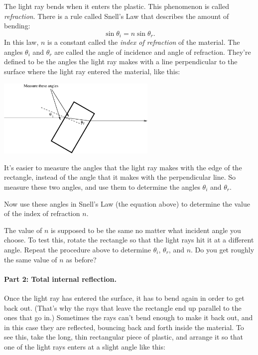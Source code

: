 The light ray bends when it enters the plastic.  This phenomenon is
called {\it refraction}.  There is a rule called Snell's Law that
describes the amount of bending:
$$
\sin\theta_i=n\sin\theta_r.
$$
In this law, $n$ is a constant called the {\it index of refraction} of 
the material.  The angles $\theta_i$ and $\theta_r$ are called the
angle of incidence and angle of refraction.  They're defined to be the
angles the light ray makes with a line perpendicular to the surface
where the light ray entered the material, like this:

\answerspace{0.1in}
\centerline{\includegraphics[width=3in]{lenses1/lensfig3.eps}}

\pagebreak[3]

It's easier to measure the angles that the light ray makes with
the edge of the rectangle, instead of the angle that it makes with
the perpendicular line.  So measure these two angles, and use them
to determine the angles $\theta_i$ and $\theta_r$.

\answerspace{1.5in}

Now use these angles in Snell's Law (the equation above) to determine
the value of the index of refraction $n$.

\answerspace{1.5in}

The value of $n$ is supposed to be the same no matter what incident angle
you choose.  To test this, rotate the rectangle so that the light
rays hit it at a different angle.  Repeat the procedure above to determine
$\theta_i$, $\theta_r$, and $n$.  Do you get roughly the same value of $n$ as
before?

\answerspace{3.0in}

\paragraph{Part 2: Total internal reflection.}
Once the light ray has entered the surface, it has to bend again
in order to get back out.  (That's why the rays that leave the rectangle
end up parallel to the ones that go in.)  Sometimes the rays can't bend
enough to make it back out, and in this case they are reflected, bouncing
back and forth inside the material.  To see this, take the long, thin
rectangular piece of plastic, and arrange it so that one of the light
rays enters at a slight angle like this:

